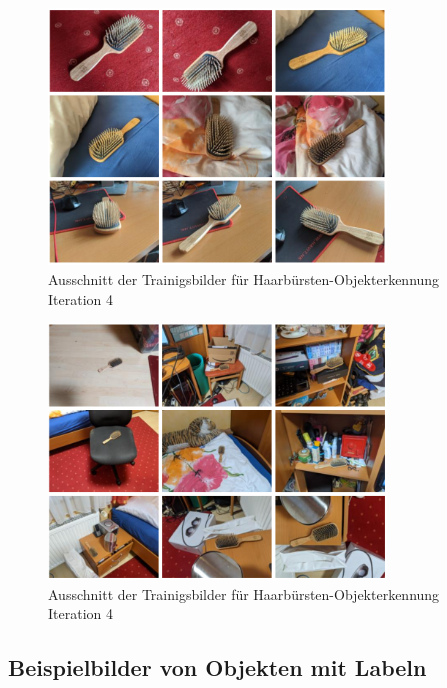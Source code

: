 \begin{figure}[H]
	\centering
	\includegraphics[width=0.8\textwidth]{images/img_it4train.PNG}
	\caption[Ausschnitt der Trainigsbilder. Iteration 4]{Ausschnitt der Trainigsbilder für Haarbürsten-Objekterkennung Iteration 4}
	\label{img:it4training}
\end{figure}

\begin{figure}[H]
	\centering
	\includegraphics[width=0.8\textwidth]{images/img_it6train.PNG}
	\caption[Ausschnitt der Trainigsbilder. Iteration 6]{Ausschnitt der Trainigsbilder für Haarbürsten-Objekterkennung Iteration 4}
	\label{img:it6training}
\end{figure}

\subsection{Beispielbilder von Objekten mit Labeln}
\label{appendix:bsp}

